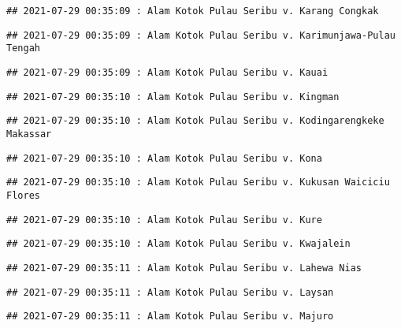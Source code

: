 \documentclass[
]{article}
\begin{document}
\begin{verbatim}
## 2021-07-29 00:35:09 : Alam Kotok Pulau Seribu v. Karang Congkak
\end{verbatim}

\begin{verbatim}
## 2021-07-29 00:35:09 : Alam Kotok Pulau Seribu v. Karimunjawa-Pulau Tengah
\end{verbatim}

\begin{verbatim}
## 2021-07-29 00:35:09 : Alam Kotok Pulau Seribu v. Kauai
\end{verbatim}

\begin{verbatim}
## 2021-07-29 00:35:10 : Alam Kotok Pulau Seribu v. Kingman
\end{verbatim}

\begin{verbatim}
## 2021-07-29 00:35:10 : Alam Kotok Pulau Seribu v. Kodingarengkeke Makassar
\end{verbatim}

\begin{verbatim}
## 2021-07-29 00:35:10 : Alam Kotok Pulau Seribu v. Kona
\end{verbatim}

\begin{verbatim}
## 2021-07-29 00:35:10 : Alam Kotok Pulau Seribu v. Kukusan Waiciciu Flores
\end{verbatim}

\begin{verbatim}
## 2021-07-29 00:35:10 : Alam Kotok Pulau Seribu v. Kure
\end{verbatim}

\begin{verbatim}
## 2021-07-29 00:35:10 : Alam Kotok Pulau Seribu v. Kwajalein
\end{verbatim}

\begin{verbatim}
## 2021-07-29 00:35:11 : Alam Kotok Pulau Seribu v. Lahewa Nias
\end{verbatim}

\begin{verbatim}
## 2021-07-29 00:35:11 : Alam Kotok Pulau Seribu v. Laysan
\end{verbatim}

\begin{verbatim}
## 2021-07-29 00:35:11 : Alam Kotok Pulau Seribu v. Majuro
\end{verbatim}
\end{document}
